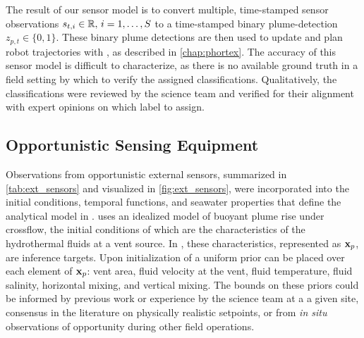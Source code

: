 The result of our sensor model is to convert multiple, time-stamped sensor observations $s_{t, i} \in \mathbb{R}, \, i = 1, \dots, S$ to a time-stamped binary plume-detection $z_{p, t} \in \{0, 1\}$. These binary plume detections are then used to update \PHUMES and plan robot trajectories with \PHORTEX, as described in \cref{chap:phortex}. The accuracy of this sensor model is difficult to characterize, as there is no available ground truth in a field setting by which to verify the assigned classifications. Qualitatively, the classifications were reviewed by the science team and verified for their alignment with expert opinions on which label to assign.


\subsection{Opportunistic Sensing Equipment}
\label{sec:external_current}
Observations from opportunistic external sensors, summarized in \cref{tab:ext_sensors} and visualized in \cref{fig:ext_sensors}, were incorporated into the initial conditions, temporal functions, and seawater properties that define the analytical model in \PHUMES. \PHUMES uses an idealized model of buoyant plume rise under crossflow, the initial conditions of which are the characteristics of the hydrothermal fluids at a vent source. In \PHUMES, these characteristics, represented as $\mathbf{x}_p$, are inference targets. Upon initialization of \PHUMES a uniform prior can be placed over each element of $\mathbf{x}_p$: vent area, fluid velocity at the vent, fluid temperature, fluid salinity, horizontal mixing, and vertical mixing. The bounds on these priors could be informed by previous work or experience by the science team at a a given site, consensus in the literature on physically realistic setpoints, or from \emph{in situ} observations of opportunity during other field operations.


